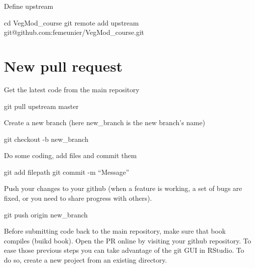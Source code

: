 \documentclass[12pt,oneside]{book}
\newenvironment{Shaded}{\begin{snugshade}}{\end{snugshade}}
\newcommand{\FunctionTok}[1]{\textcolor[rgb]{0.00,0.00,0.00}{#1}}
\newcommand{\BuiltInTok}[1]{#1}
\newcommand{\NormalTok}[1]{#1}
\begin{document}
Define upstream

\begin{Shaded}
\begin{Highlighting}[]
\BuiltInTok{cd}\NormalTok{ VegMod_course}
\FunctionTok{git}\NormalTok{ remote add upstream git@github.com:femeunier/VegMod_course.git}
\end{Highlighting}
\end{Shaded}

\section*{New pull request}\label{new-pull-request}

Get the latest code from the main repository

\begin{Shaded}
\begin{Highlighting}[]
\FunctionTok{git}\NormalTok{ pull upstream master}
\end{Highlighting}
\end{Shaded}

Create a new branch (here new\_branch is the new branch's name)

\begin{Shaded}
\begin{Highlighting}[]
\FunctionTok{git}\NormalTok{ checkout -b new_branch}
\end{Highlighting}
\end{Shaded}

Do some coding, add files and commit them

\begin{Shaded}
\begin{Highlighting}[]
\FunctionTok{git}\NormalTok{ add filepath}
\FunctionTok{git}\NormalTok{ commit -m “Message”}
\end{Highlighting}
\end{Shaded}

Push your changes to your github (when a feature is working, a set of
bugs are fixed, or you need to share progress with others).

\begin{Shaded}
\begin{Highlighting}[]
\FunctionTok{git}\NormalTok{ push origin new_branch}
\end{Highlighting}
\end{Shaded}

Before submitting code back to the main repository, make sure that book
compiles (buikd book). Open the PR online by visiting your github
repository. To ease those previous steps you can take advantage of the
git GUI in RStudio. To do so, create a new project from an existing
directory.
\end{document}

